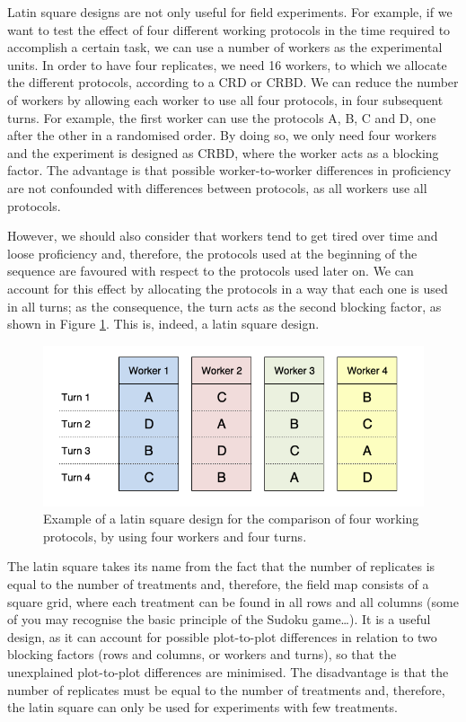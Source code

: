 \documentclass[a4paper,12pt,oneside]{book}
\begin{document}
Latin square designs are not only useful for field experiments. For example, if we want to test the effect of four different working protocols in the time required to accomplish a certain task, we can use a number of workers as the experimental units. In order to have four replicates, we need 16 workers, to which we allocate the different protocols, according to a CRD or CRBD. We can reduce the number of workers by allowing each worker to use all four protocols, in four subsequent turns. For example, the first worker can use the protocols A, B, C and D, one after the other in a randomised order. By doing so, we only need four workers and the experiment is designed as CRBD, where the worker acts as a blocking factor. The advantage is that possible worker-to-worker differences in proficiency are not confounded with differences between protocols, as all workers use all protocols.

However, we should also consider that workers tend to get tired over time and loose proficiency and, therefore, the protocols used at the beginning of the sequence are favoured with respect to the protocols used later on. We can account for this effect by allocating the protocols in a way that each one is used in all turns; as the consequence, the turn acts as the second blocking factor, as shown in Figure \ref{fig:figName36}. This is, indeed, a latin square design.

\begin{figure}

{\centering \includegraphics[width=0.9\linewidth]{_images/TurniOperatori} 

}

\caption{Example of a latin square design for the comparison of four working protocols, by using four workers and four turns.}\label{fig:figName36}
\end{figure}

The latin square takes its name from the fact that the number of replicates is equal to the number of treatments and, therefore, the field map consists of a square grid, where each treatment can be found in all rows and all columns (some of you may recognise the basic principle of the Sudoku game\ldots). It is a useful design, as it can account for possible plot-to-plot differences in relation to two blocking factors (rows and columns, or workers and turns), so that the unexplained plot-to-plot differences are minimised. The disadvantage is that the number of replicates must be equal to the number of treatments and, therefore, the latin square can only be used for experiments with few treatments.
\end{document}

